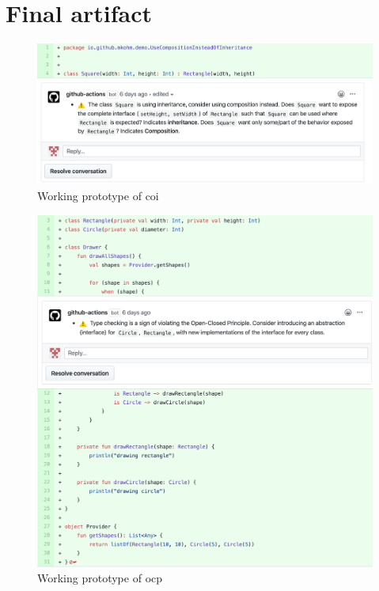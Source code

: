 \clearpage
\section{Final artifact}
\label{final-artifact}
\begin{figure}[h!]
    \centering
    \includegraphics[width=\textwidth]{images/final_coh.png}
    \caption{Working prototype of \gls{coi}}
\end{figure}

\begin{figure}[h!]
    \centering
    \includegraphics[width=\textwidth]{images/final_ocp.png}
    \caption{Working prototype of \gls{ocp}}
\end{figure}

